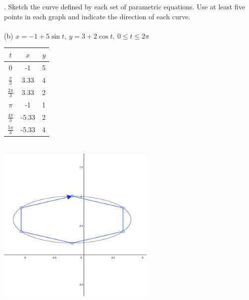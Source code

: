 \documentclass[11pt]{exam}
\begin{document}
. Sketch the curve defined by each set of parametric equations. Use at least five points in each graph and indicate the direction of each curve. \\
\\
\indent (b) $x = -1 + 5\sin t,\ y = 3 + 2 \cos t,\ 0 \leq t \leq 2\pi$\\
\newline
\newline
\def\arraystretch{1.5}
\begin{tabular}{ c|c|c }
  $t$ & $x$ & $y$ \\
  \hline
  0                & -1    & 5 \\
  $\frac{\pi}{3}$  &  3.33 & 4 \\
  $\frac{2\pi}{3}$ &  3.33 & 2 \\
  $\pi$            & -1    & 1 \\
  $\frac{4\pi}{3}$ & -5.33 & 2 \\
  $\frac{5\pi}{3}$ & -5.33 & 4 \\
\end{tabular}\\
\includegraphics[width=3in]{g1b.png}
\end{document}
